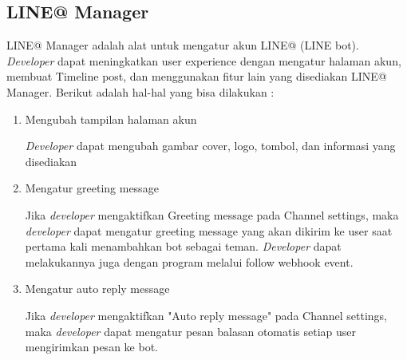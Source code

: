 \subsection{LINE@ Manager}
LINE@ Manager adalah alat untuk mengatur akun LINE@ (LINE bot). \textit{Developer} dapat meningkatkan user experience dengan mengatur halaman akun, membuat Timeline post, dan menggunakan fitur lain yang disediakan LINE@ Manager. Berikut adalah hal-hal yang bisa dilakukan :
\begin{enumerate}
\item Mengubah tampilan halaman akun

\textit{Developer} dapat mengubah gambar cover, logo, tombol, dan informasi yang disediakan

\item Mengatur greeting message

Jika \textit{developer} mengaktifkan Greeting message pada Channel settings, maka \textit{developer} dapat mengatur greeting message yang akan dikirim ke user saat pertama kali menambahkan bot sebagai teman. \textit{Developer} dapat melakukannya juga dengan program melalui follow webhook event.

\item Mengatur auto reply message

Jika \textit{developer} mengaktifkan "Auto reply message" pada Channel settings, maka \textit{developer} dapat mengatur pesan balasan otomatis setiap user mengirimkan pesan ke bot.
\end{enumerate}
